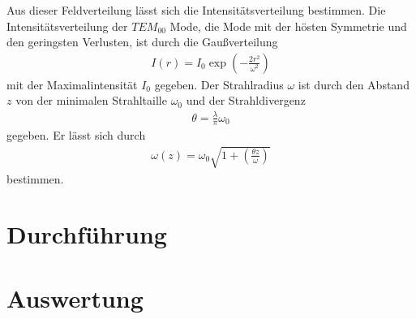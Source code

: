 \documentclass[]{scrartcl}
\begin{document}
Aus dieser Feldverteilung lässt sich die Intensitätsverteilung bestimmen. Die Intensitätsverteilung der $TEM_{00}$ Mode, die Mode mit der hösten Symmetrie und den geringsten Verlusten, ist durch die Gaußverteilung
\begin{align}
 I\left(r\right)=I_0\exp \left(-\frac{2r^2}{\omega^2}\right)
 \label{eq:tem00}
\end{align}
mit der Maximalintensität $I_0$ gegeben. Der Strahlradius $\omega$ ist durch den Abstand $z$ von der minimalen Strahltaille $\omega_0$ und der Strahldivergenz 
\begin{align}
 \theta = \frac{\lambda}{\pi}\omega_0
\end{align}
gegeben. Er lässt sich durch
\begin{align}
 \omega\left(z\right)=\omega_0\sqrt{1+\left(\frac{\theta z}{\omega}\right)}
\end{align}
bestimmen. 
\section{Durchführung}

\section{Auswertung}
\end{document}
